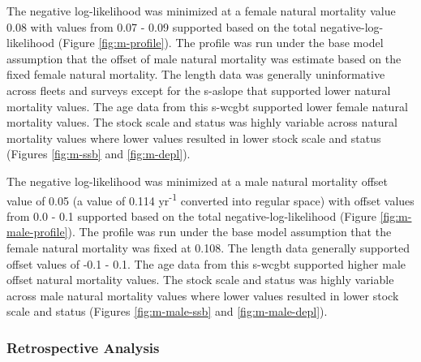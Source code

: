 \documentclass[11pt,
  english,
  a4paper,
]{article}
\begin{document}
\leavevmode\tagmcend\tagstructend\par


The negative log-likelihood was minimized at a female natural mortality value 0.08 with values from 0.07 - 0.09 supported based on the total negative-log-likelihood (Figure \ref{fig:m-profile}). The profile was run under the base model assumption that the offset of male natural mortality was estimate based on the fixed female natural mortality. The length data was generally uninformative across fleets and surveys except for the \gls{s-aslope} that supported lower natural mortality values. The age data from this \gls{s-wcgbt} supported lower female natural mortality values. The stock scale and status was highly variable across natural mortality values where lower values resulted in lower stock scale and status (Figures \ref{fig:m-ssb} and \ref{fig:m-depl}).

\leavevmode\tagmcend\tagstructend\par


The negative log-likelihood was minimized at a male natural mortality offset value of 0.05 (a value of 0.114 yr\textsuperscript{-1} converted into regular space) with offset values from 0.0 - 0.1 supported based on the total negative-log-likelihood (Figure \ref{fig:m-male-profile}). The profile was run under the base model assumption that the female natural mortality was fixed at 0.108. The length data generally supported offset values of -0.1 - 0.1. The age data from this \gls{s-wcgbt} supported higher male offset natural mortality values. The stock scale and status was highly variable across male natural mortality values where lower values resulted in lower stock scale and status (Figures \ref{fig:m-male-ssb} and \ref{fig:m-male-depl}).

\leavevmode\tagmcend\tagstructend\par


\hypertarget{retrospective-analysis}{%
\subsubsection{Retrospective Analysis}\label{retrospective-analysis}}

\leavevmode\tagmcend\tagstructend

\end{document}
